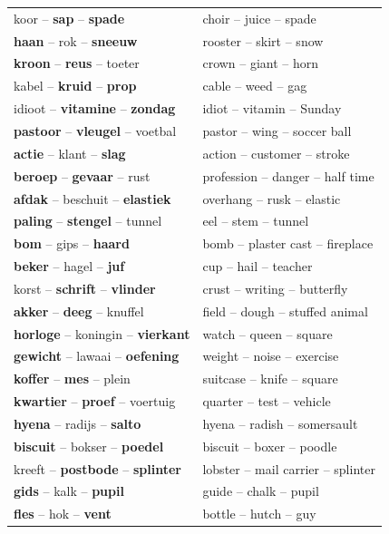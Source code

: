 \documentclass[doc]{apa6}
\begin{document}
\begin{appendix}
\begin{small}
\begin{longtable}{ll}
koor -- \textbf{sap} -- \textbf{spade} & choir -- juice -- spade\\
\textbf{haan} -- rok -- \textbf{sneeuw} & rooster -- skirt -- snow\\
\textbf{kroon} -- \textbf{reus} -- toeter & crown -- giant -- horn\\
kabel -- \textbf{kruid} -- \textbf{prop} & cable -- weed -- gag\\
idioot -- \textbf{vitamine} -- \textbf{zondag} & idiot -- vitamin -- Sunday\\
\textbf{pastoor} -- \textbf{vleugel} -- voetbal & pastor -- wing -- soccer ball\\
\textbf{actie} -- klant -- \textbf{slag} & action -- customer -- stroke\\
\textbf{beroep} -- \textbf{gevaar} -- rust & profession -- danger -- half time\\
\textbf{afdak} -- beschuit -- \textbf{elastiek} & overhang -- rusk -- elastic\\
\textbf{paling} -- \textbf{stengel} -- tunnel & eel -- stem -- tunnel\\
\textbf{bom} -- gips -- \textbf{haard} & bomb -- plaster cast -- fireplace\\
\textbf{beker} -- hagel -- \textbf{juf} & cup -- hail -- teacher\\
korst -- \textbf{schrift} -- \textbf{vlinder} & crust -- writing -- butterfly\\
\textbf{akker} -- \textbf{deeg} -- knuffel & field -- dough -- stuffed animal\\
\textbf{horloge} -- koningin -- \textbf{vierkant} & watch -- queen -- square\\
\textbf{gewicht} -- lawaai -- \textbf{oefening} & weight -- noise -- exercise\\
\textbf{koffer} -- \textbf{mes} -- plein & suitcase -- knife -- square\\
\textbf{kwartier} -- \textbf{proef} -- voertuig & quarter -- test -- vehicle\\
\textbf{hyena} -- radijs -- \textbf{salto} & hyena -- radish -- somersault\\
\textbf{biscuit} -- bokser -- \textbf{poedel} & biscuit -- boxer -- poodle\\
kreeft -- \textbf{postbode} -- \textbf{splinter} & lobster -- mail carrier -- splinter\\
\textbf{gids} -- kalk -- \textbf{pupil} & guide -- chalk -- pupil\\
\textbf{fles} -- hok -- \textbf{vent} & bottle -- hutch -- guy\\

\end{longtable}
\end{small}
\end{appendix}
\end{document}
